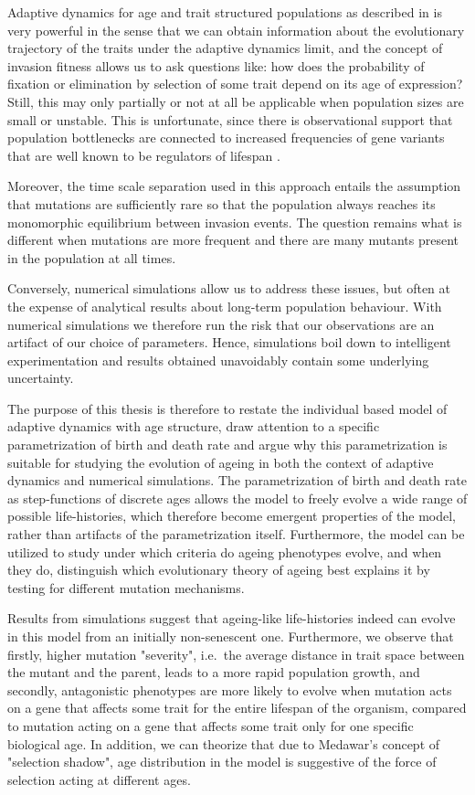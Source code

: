 \documentclass[11pt, a4paper]{article}
\theoremstyle{definition}
\begin{document}
    Adaptive dynamics for age and trait structured populations as described in \autocite{meleard2009tss} is very powerful in the sense that we can obtain information about the evolutionary trajectory of the traits under the adaptive dynamics limit, and the concept of invasion fitness allows us to ask questions like: how does the probability of fixation or elimination by selection of some trait depend on its age of expression? Still, this may only partially or not at all be applicable when
    population sizes are small or unstable.
    This is unfortunate, since there is observational support that population bottlenecks are connected to increased frequencies of gene variants that are well known to be regulators of lifespan \autocite{ray2019}.

    Moreover, the time scale separation used in this approach entails the assumption that mutations are sufficiently rare so that the population always reaches its monomorphic equilibrium between invasion events. The question remains what is different when mutations are more frequent and there are many mutants present in the population at all times.

    Conversely, numerical simulations allow us to address these issues, but often at the expense of analytical results about long-term population behaviour. With numerical simulations we therefore run the risk that our observations are an artifact of our choice of parameters. Hence, simulations boil down to intelligent experimentation and results obtained unavoidably contain some underlying uncertainty.

    The purpose of this thesis is therefore to restate the individual based model of adaptive dynamics with age structure, draw attention to a specific parametrization of birth and death rate and argue why this parametrization is suitable for studying the evolution of ageing in both the context of adaptive dynamics and numerical simulations.
    The parametrization of birth and death rate as step-functions of discrete ages allows the model to freely evolve a wide range of possible life-histories, which therefore become emergent properties of the model, rather than artifacts of the parametrization itself. Furthermore, the model can be utilized to study under which criteria do ageing phenotypes evolve, and when they do, distinguish which evolutionary theory of ageing best explains it by testing for different mutation mechanisms.

    Results from simulations suggest that ageing-like life-histories indeed can evolve in this model from an initially non-senescent one. Furthermore, we observe that firstly, higher mutation "severity", i.e.\ the average distance in trait space between the mutant and the parent, leads to a more rapid population growth, and secondly, antagonistic phenotypes are more likely to evolve when mutation acts on a gene that affects some trait for the entire lifespan of the organism, compared to mutation acting on a gene that affects some trait only for one specific biological age.
    In addition, we can theorize that due to Medawar's concept of "selection shadow", age distribution in the model is suggestive of the force of selection acting at different ages.
\end{document}
